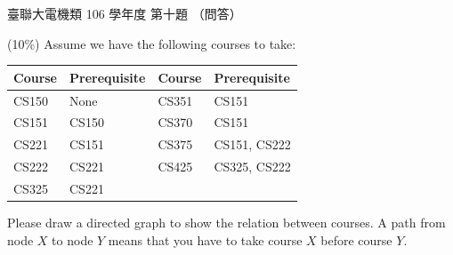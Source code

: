 \begin{pastexam}[label={px:ust-106-ee-ds-10}]{臺聯大電機類 106 學年度 第十題}
（問答）

(10\%) Assume we have the following courses to take:

\begin{center}
\begin{tabular}{|l|l|l|l|}\hline
Course & Prerequisite & Course & Prerequisite\\\hline
CS150 & None & CS351 & CS151\\\hline
CS151 & CS150 & CS370 & CS151\\\hline
CS221 & CS151 & CS375 & CS151, CS222\\\hline
CS222 & CS221 & CS425 & CS325, CS222\\\hline
CS325 & CS221 & & \\\hline
\end{tabular}
\end{center}

Please draw a directed graph to show the relation between courses. A path from node $X$ to node $Y$ means
that you have to take course $X$ before course $Y$.
\end{pastexam}

